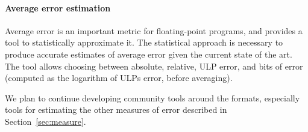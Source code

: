 \documentclass[main.tex]{subfiles}
\begin{document}
\paragraph{Average error estimation}
Average error is an important metric for floating-point programs,
  and \name provides a tool to statistically approximate it.
The statistical approach is necessary to produce accurate estimates
  of average error given the current state of the art.
The tool allows choosing between absolute, relative, ULP error,
  and bits of error (computed as the logarithm of ULPs error, before averaging).

We plan to continue developing community tools around the \name formats,
  especially tools for estimating the other measures of error
  described in Section~\ref{sec:measure}.
\end{document}
